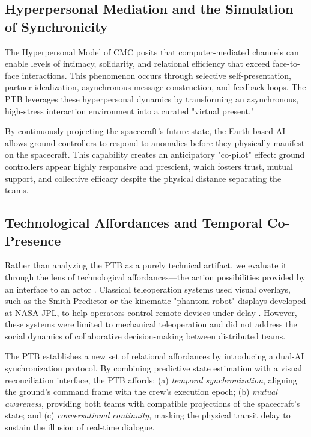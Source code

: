 \documentclass[12pt,a4paper]{article}
\begin{document}
\subsection{Hyperpersonal Mediation and the Simulation of Synchronicity}

The Hyperpersonal Model of CMC \citep{walther1996} posits that computer-mediated channels can enable levels of intimacy, solidarity, and relational efficiency that exceed face-to-face interactions. This phenomenon occurs through selective self-presentation, partner idealization, asynchronous message construction, and feedback loops. The PTB leverages these hyperpersonal dynamics by transforming an asynchronous, high-stress interaction environment into a curated "virtual present." 

By continuously projecting the spacecraft's future state, the Earth-based AI allows ground controllers to respond to anomalies before they physically manifest on the spacecraft. This capability creates an anticipatory "co-pilot" effect: ground controllers appear highly responsive and prescient, which fosters trust, mutual support, and collective efficacy despite the physical distance separating the teams.

\subsection{Technological Affordances and Temporal Co-Presence}

Rather than analyzing the PTB as a purely technical artifact, we evaluate it through the lens of technological affordances---the action possibilities provided by an interface to an actor \citep{hancock2020}. Classical teleoperation systems used visual overlays, such as the Smith Predictor or the kinematic "phantom robot" displays developed at NASA JPL, to help operators control remote devices under delay \citep{bejczy1990, sheridan1993}. However, these systems were limited to mechanical teleoperation and did not address the social dynamics of collaborative decision-making between distributed teams.

The PTB establishes a new set of relational affordances by introducing a dual-AI synchronization protocol. By combining predictive state estimation with a visual reconciliation interface, the PTB affords: (a) \textit{temporal synchronization}, aligning the ground's command frame with the crew's execution epoch; (b) \textit{mutual awareness}, providing both teams with compatible projections of the spacecraft's state; and (c) \textit{conversational continuity}, masking the physical transit delay to sustain the illusion of real-time dialogue.
\end{document}
